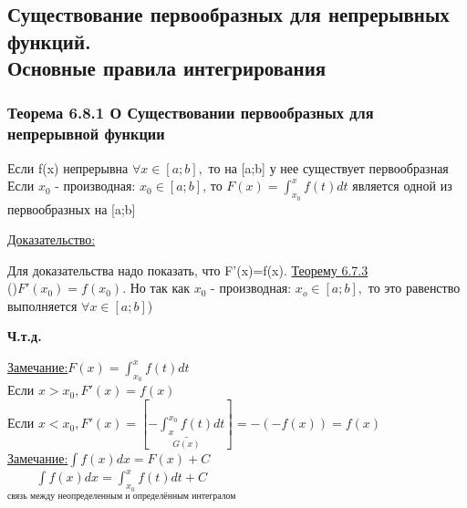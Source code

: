 \documentclass[12pt]{article}
\begin{document}
    \subsection{Существование первообразных для непрерывных функций. \\Основные правила интегрирования}
    \subsubsection*{Теорема 6.8.1 О Существовании первообразных для непрерывной функции}\label{th:6.8.1}
    Если f(x) непрерывна $\forall x \in [a;b],$ то на [a;b] у нее существует первообразная\\
    Если $x_0$ - производная: $x_0 \in [a;b]$, то $F(x)=\int_{x_0}^{x}f(t)dt $ является одной из первообразных на [a;b]\par\noindent
    \underline{Доказательство:}
    \begin{adjustwidth}{1.5em}{1.5em}
        Для доказательства надо показать, что F'(x)=f(x). \hyperref[th:6.7.3]{Теорему 6.7.3}\\
        ()$F'(x_0)=f(x_0)$. Но так как $x_0$ - производная: $x_o \in [a;b],$ то это равенство выполняется $\forall x \in [a;b]$)
    \end{adjustwidth}
    \begin{center}
        \textbf{Ч.т.д.}
    \end{center}
    \underline{Замечание:}$F(x)=\int_{x_0}^{x}f(t)dt$\\
    Если $x>x_0, F'(x)=f(x)$\\
    Если $x<x_0, F'(x)=[\underset{G(x)}{\underline{-\int_{x}^{x_0}f(t)dt}}]=-(-f(x))=f(x)$\\
    \underline{Замечание:}$\int f(x)dx=F(x)+C$\\
    $\underset{\text{связь между неопределенным и определённым интегралом}}{\int f(x)dx = \int_{x_0}^{x}f(t)dt+C}$
\end{document}
